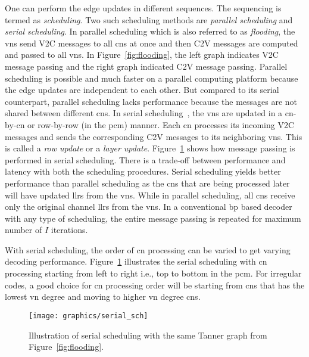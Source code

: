 One can perform the edge updates in different sequences. The sequencing is termed as \emph{scheduling}. Two such scheduling methods are \emph{parallel scheduling} and \emph{serial scheduling}. In parallel scheduling which is also referred to as \emph{flooding}, the \glspl{vn} send V2C messages to all \glspl{cn} at once and then C2V messages are computed and passed to all \glspl{vn}. In Figure~\ref{fig:flooding}, the left graph indicates V2C message passing and the right graph indicated C2V message passing. Parallel scheduling is possible and much faster on a parallel computing platform because the edge updates are independent to each other. But compared to its serial counterpart, parallel scheduling lacks performance because the messages are not shared between different \glspl{cn}. In serial scheduling~\cite{Zhang2002}, the \glspl{vn} are updated in a \gls{cn}-by-\gls{cn} or row-by-row (in the \gls{pcm}) manner. Each \gls{cn} processes its incoming V2C messages and sends the corresponding C2V messages to its neighboring \glspl{vn}. This is called a \emph{row update} or a \emph{layer update}. Figure~\ref{fig:serial_sch} shows how message passing is performed in serial scheduling. There is a trade-off between performance and latency with both the scheduling procedures. Serial scheduling yields better performance than parallel scheduling as the \glspl{cn} that are being processed later will have updated \glspl{llr} from the \glspl{vn}. While in parallel scheduling, all \glspl{cn} receive only the original channel \glspl{llr} from the \glspl{vn}. In a conventional \gls{bp} based decoder with any type of scheduling, the entire message passing is repeated for maximum number of $I$ iterations.

With serial scheduling, the order of \gls{cn} processing can be varied to get varying decoding performance. Figure~\ref{fig:serial_sch} illustrates the serial scheduling with \gls{cn} processing starting from left to right i.e., top to bottom in the \gls{pcm}. For irregular codes, a good choice for \gls{cn} processing order will be starting from \glspl{cn} that has the lowest \gls{vn} degree and moving to higher \gls{vn} degree \glspl{cn}.

\begin{figure}[htbp]
  \centering
  \texttt{[image: graphics/serial\_sch]}
  \caption{Illustration of serial scheduling with the same Tanner graph from Figure~\ref{fig:flooding}.}
  \label{fig:serial_sch}
\end{figure}

